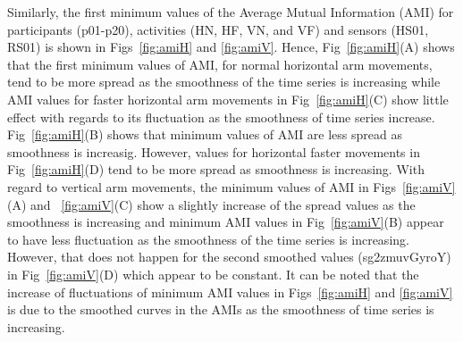 Similarly, the first minimum values of the Average Mutual Information (AMI) 
for participants (p01-p20), activities (HN, HF, VN, and VF) and 
sensors (HS01, RS01) is shown in Figs~\ref{fig:amiH} and \ref{fig:amiV}.
Hence, Fig~\ref{fig:amiH}(A) shows that the first minimum values of AMI,
for normal horizontal arm movements, tend to be more spread as the smoothness 
of the time series is increasing while AMI values for faster horizontal arm 
movements in Fig~\ref{fig:amiH}(C) show little effect with regards
to its fluctuation as the smoothness of time series increase.
Fig~\ref{fig:amiH}(B) shows that minimum values of AMI are 
less spread as smoothness is increasig. However, values for horizontal
faster movements in Fig~\ref{fig:amiH}(D) tend to be more spread as 
smoothness is increasing.
With regard to vertical arm movements,
the minimum values of AMI in Figs~\ref{fig:amiV}(A) and ~\ref{fig:amiV}(C) 
show a slightly increase of the spread values as the smoothness is increasing
and minimum AMI values in Fig~\ref{fig:amiV}(B) appear to have less 
fluctuation as the smoothness of the time series is increasing. However, 
that does not happen for the second smoothed values (sg2zmuvGyroY) in 
Fig~\ref{fig:amiV}(D) which appear to be constant.
It can be noted that the increase of fluctuations of minimum AMI values 
in Figs~\ref{fig:amiH} and \ref{fig:amiV} is due to the smoothed curves in 
the AMIs as the smoothness of time series is increasing.



